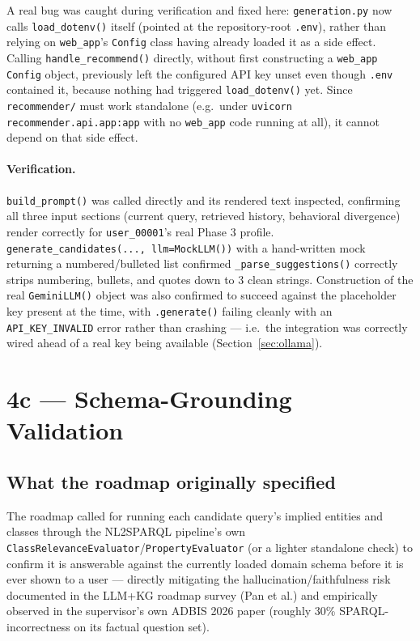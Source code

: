 \documentclass[11pt,a4paper]{article}
\newcommand{\code}[1]{\texttt{#1}}
\begin{document}
A real bug was caught during verification and fixed here: \code{generation.py} now calls
\code{load\_dotenv()} itself (pointed at the repository-root \code{.env}), rather than relying on
\code{web\_app}'s \code{Config} class having already loaded it as a side effect. Calling
\code{handle\_recommend()} directly, without first constructing a \code{web\_app} \code{Config}
object, previously left the configured API key unset even though \code{.env} contained it, because
nothing had triggered \code{load\_dotenv()} yet. Since \code{recommender/} must work standalone
(e.g.\ under \code{uvicorn recommender.api.app:app} with no \code{web\_app} code running at all),
it cannot depend on that side effect.

\paragraph{Verification.} \code{build\_prompt()} was called directly and its rendered text
inspected, confirming all three input sections (current query, retrieved history, behavioral
divergence) render correctly for \code{user\_00001}'s real Phase 3 profile.
\code{generate\_candidates(..., llm=MockLLM())} with a hand-written mock returning a
numbered/bulleted list confirmed \code{\_parse\_suggestions()} correctly strips numbering, bullets,
and quotes down to 3 clean strings. Construction of the real \code{GeminiLLM()} object was also
confirmed to succeed against the placeholder key present at the time, with \code{.generate()}
failing cleanly with an \code{API\_KEY\_INVALID} error rather than crashing --- i.e.\ the
integration was correctly wired ahead of a real key being available (Section~\ref{sec:ollama}).

\newpage
\section{4c --- Schema-Grounding Validation}
\label{sec:4c}

\subsection{What the roadmap originally specified}

The roadmap called for running each candidate query's implied entities and classes through the
NL2SPARQL pipeline's own \code{ClassRelevanceEvaluator}/\code{PropertyEvaluator} (or a lighter
standalone check) to confirm it is answerable against the currently loaded domain schema before it
is ever shown to a user --- directly mitigating the hallucination/faithfulness risk documented in
the LLM+KG roadmap survey (Pan et al.) and empirically observed in the supervisor's own ADBIS 2026
paper (roughly 30\% SPARQL-incorrectness on its factual question set).
\end{document}
